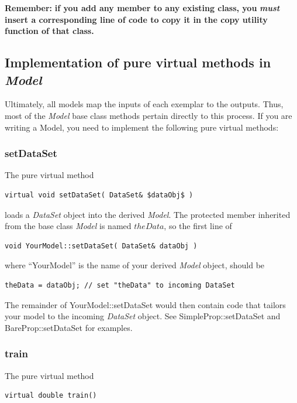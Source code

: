 \documentclass{report}
\begin{document}
{\large \bf Remember:} {\bf if you add any member to any existing
class, you} {\bf \em must} {\bf insert a corresponding line of code to
copy it in the copy utility function of that class.}

\subsection{Implementation of pure virtual methods in {\em Model}}

Ultimately, all models map the inputs of each exemplar to the outputs.
Thus, most of the {\em Model} base class methods pertain directly to
this process.  If you are writing a Model, you need to implement the
following pure virtual methods:

\subsubsection{setDataSet}
The pure virtual method

\begin{verbatim}
virtual void setDataSet( DataSet& $dataObj$ )
\end{verbatim}

loads a {\em DataSet} object into the derived {\em Model}.  The
protected member inherited from the base class {\em Model} is named
$theData$, so the first line of

\begin{verbatim}
void YourModel::setDataSet( DataSet& dataObj )
\end{verbatim}

where ``YourModel'' is the name of your derived {\em Model} object,
should be

\begin{verbatim}
theData = dataObj; // set "theData" to incoming DataSet
\end{verbatim}

The remainder of YourModel::setDataSet would then contain code that
tailors your model to the incoming {\em DataSet} object.  See
SimpleProp::setDataSet and BareProp::setDataSet for examples.

\subsubsection{train}
The pure virtual method

\begin{verbatim}
virtual double train()
\end{verbatim}
\end{document}
